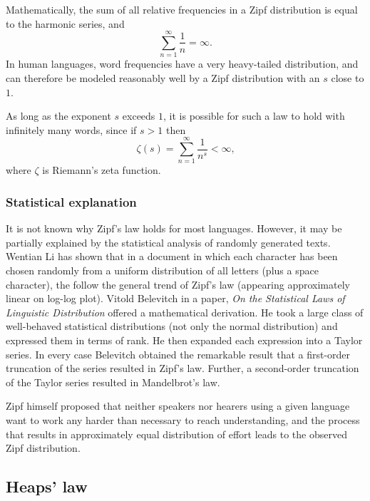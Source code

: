       Mathematically, the sum of all relative frequencies in a Zipf distribution is equal to the harmonic series, and
      \begin{equation}
        \sum_{n=1}^\infty \frac{1}{n}=\infty\mbox{.}
      \end{equation}
      In human languages, word frequencies have a very heavy-tailed distribution, and can therefore be modeled reasonably well by a Zipf distribution with an $s$ close to $1$.

      As long as the exponent $s$ exceeds $1$, it is possible for such a law to hold with infinitely many words, since if $s > 1$ then
      \begin{equation}
        \zeta (s) = \sum_{n=1}^\infty \frac{1}{n^s}<\infty\mbox{,}
      \end{equation}
      where $\zeta$ is Riemann's zeta function.

    \subsubsection{Statistical explanation}
      
      It is not known why Zipf's law holds for most languages\cite{Brillouin2004}. However, it may be partially explained by the statistical analysis of randomly generated texts. Wentian Li has shown that in a document in which each character has been chosen randomly from a uniform distribution of all letters (plus a space character), the  follow the general trend of Zipf's law (appearing approximately linear on log-log plot)\cite{Li1992}. Vitold Belevitch in a paper, \emph{On the Statistical Laws of Linguistic Distribution} offered a mathematical derivation. He took a large class of well-behaved statistical distributions (not only the normal distribution) and expressed them in terms of rank. He then expanded each expression into a Taylor series. In every case Belevitch obtained the remarkable result that a first-order truncation of the series resulted in Zipf's law. Further, a second-order truncation of the Taylor series resulted in Mandelbrot's law\cite{Neumann2013,Belevitch1959}.

      Zipf himself proposed that neither speakers nor hearers using a given language want to work any harder than necessary to reach understanding, and the process that results in approximately equal distribution of effort leads to the observed Zipf distribution\cite{Zipf1949,CanchoSole2003}.
  
  \subsection{Heaps' law}
  
